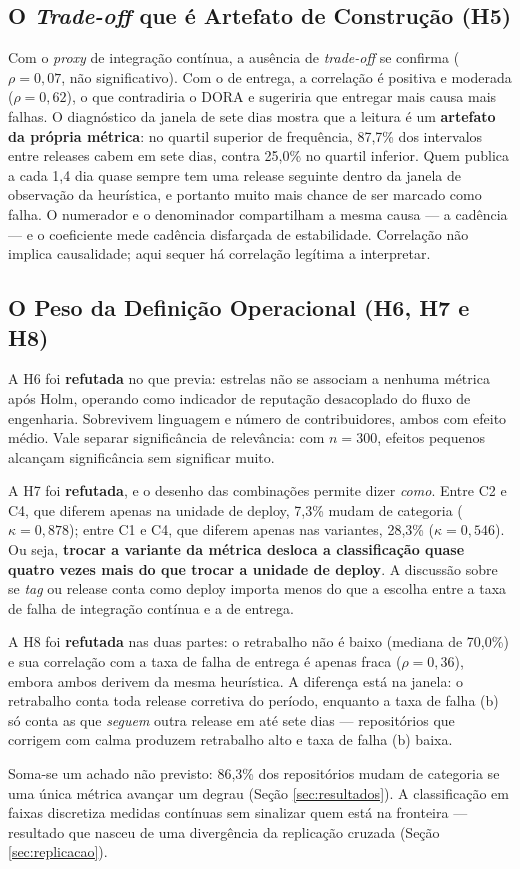 \subsection{O \emph{Trade-off} que é Artefato de Construção (H5)}

Com o \emph{proxy} de integração contínua, a ausência de \emph{trade-off} se confirma ($\rho = 0{,}07$, não
significativo). Com o de entrega, a correlação é positiva e moderada ($\rho = 0{,}62$), o que
contradiria o DORA e sugeriria que entregar mais causa mais falhas. O diagnóstico da janela
de sete dias mostra que a leitura é um \textbf{artefato da própria métrica}: no quartil
superior de frequência, 87,7\% dos intervalos entre releases cabem em sete dias, contra
25,0\% no quartil inferior. Quem publica a cada 1,4 dia quase sempre tem uma release seguinte
dentro da janela de observação da heurística, e portanto muito mais chance de ser marcado
como falha. O numerador e o denominador compartilham a mesma causa --- a cadência --- e o
coeficiente mede cadência disfarçada de estabilidade. Correlação não implica causalidade;
aqui sequer há correlação legítima a interpretar.

\subsection{O Peso da Definição Operacional (H6, H7 e H8)}

A H6 foi \textbf{refutada} no que previa: estrelas não se associam a nenhuma métrica após
Holm, operando como indicador de reputação desacoplado do fluxo de engenharia. Sobrevivem
linguagem e número de contribuidores, ambos com efeito médio. Vale separar significância de
relevância: com $n = 300$, efeitos pequenos alcançam significância sem significar muito.

A H7 foi \textbf{refutada}, e o desenho das combinações permite dizer \emph{como}. Entre C2 e
C4, que diferem apenas na unidade de deploy, 7,3\% mudam de categoria
($\kappa = 0{,}878$); entre C1 e C4, que diferem apenas nas variantes, 28,3\%
($\kappa = 0{,}546$). Ou seja, \textbf{trocar a variante da métrica desloca a classificação
quase quatro vezes mais do que trocar a unidade de deploy}. A discussão sobre se \emph{tag} ou
release conta como deploy importa menos do que a escolha entre a taxa de falha de integração contínua e a de entrega.

A H8 foi \textbf{refutada} nas duas partes: o retrabalho não é baixo (mediana de 70,0\%) e sua
correlação com a taxa de falha de entrega é apenas fraca ($\rho = 0{,}36$), embora ambos derivem da
mesma heurística. A diferença está na janela: o retrabalho conta toda release corretiva do
período, enquanto a taxa de falha (b) só conta as que \emph{seguem} outra release em até sete dias ---
repositórios que corrigem com calma produzem retrabalho alto e taxa de falha (b) baixa.

Soma-se um achado não previsto: 86,3\% dos repositórios mudam de categoria se uma única
métrica avançar um degrau (Seção \ref{sec:resultados}). A classificação em faixas discretiza
medidas contínuas sem sinalizar quem está na fronteira --- resultado que nasceu de uma
divergência da replicação cruzada (Seção \ref{sec:replicacao}).
